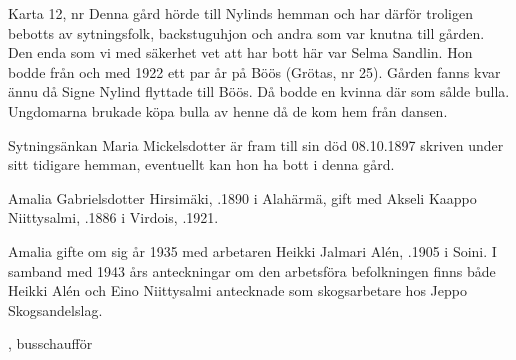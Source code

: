 Karta 12,   nr 
Denna gård hörde till Nylinds hemman och har därför troligen bebotts av sytningsfolk, backstuguhjon och andra som var knutna till gården. Den enda som vi med säkerhet vet att har bott här var Selma Sandlin. Hon bodde från och med 1922 ett par år på Böös (Grötas, nr 25). Gården fanns kvar ännu då Signe Nylind flyttade till Böös. Då bodde en kvinna där som sålde bulla. Ungdomarna brukade köpa bulla av henne då de kom hem från dansen.

Sytningsänkan Maria Mickelsdotter är fram till sin död 08.10.1897 skriven under sitt tidigare hemman, eventuellt kan hon ha bott i denna gård.



%



%
Amalia Gabrielsdotter Hirsimäki, .1890 i Alahärmä, gift med Akseli Kaappo Niittysalmi, .1886 i Virdois, .1921.

Amalia gifte om sig år 1935 med arbetaren Heikki Jalmari Alén, .1905 i Soini. I samband med 1943 års anteckningar om den arbetsföra befolkningen finns både Heikki Alén och Eino Niittysalmi antecknade som skogsarbetare hos Jeppo Skogsandelslag.
\begin{jhchildren}
  \item {}
  \item {}
  \item {}, busschaufför
  \item {}
  \item {}
  \item {}
  \item {}
  \item {}
\end{jhchildren}

